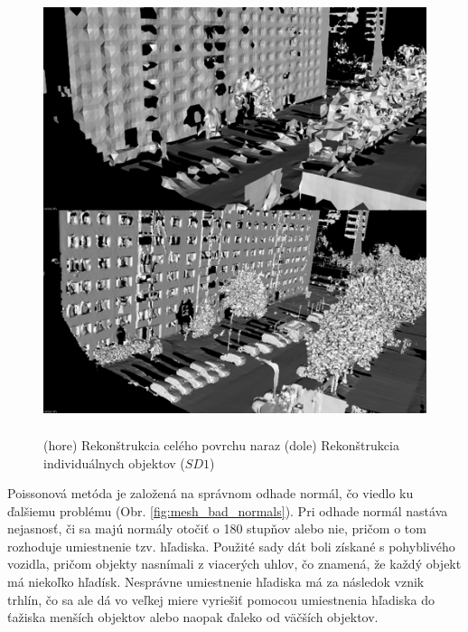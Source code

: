 \begin{figure}[!htbp]
  \centering
  \includegraphics[width=16cm, height=13cm]{img/mesh_no_segmentation.png}
  \caption{(hore) Rekonštrukcia celého povrchu naraz (dole) Rekonštrukcia individuálnych objektov ($SD1$)} 
  \label{fig:mesh_no_segmentation}
\end{figure} 

\indent Poissonová metóda je založená na správnom odhade normál, čo viedlo ku ďalšiemu problému (Obr. \ref{fig:mesh_bad_normals}). Pri odhade normál nastáva nejasnosť, či sa majú normály otočiť o 180 stupňov alebo nie, pričom o tom rozhoduje umiestnenie tzv. hľadiska. Použité sady dát boli získané s pohyblivého vozidla, pričom objekty nasnímali z viacerých uhlov, čo znamená, že každý objekt má niekoľko hľadísk. Nesprávne umiestnenie hľadiska má za následok vznik trhlín, čo sa ale dá vo veľkej miere vyriešiť pomocou umiestnenia hľadiska do ťažiska menších objektov alebo naopak ďaleko od väčších objektov.

